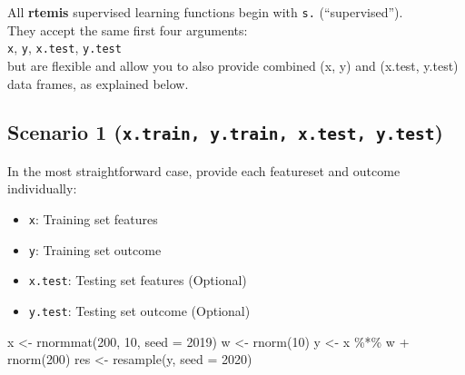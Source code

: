 \documentclass[
]{book}
\newenvironment{Shaded}{\begin{snugshade}}{\end{snugshade}}
\newcommand{\AttributeTok}[1]{\textcolor[rgb]{0.77,0.63,0.00}{#1}}
\newcommand{\DecValTok}[1]{\textcolor[rgb]{0.00,0.00,0.81}{#1}}
\newcommand{\FunctionTok}[1]{\textcolor[rgb]{0.00,0.00,0.00}{#1}}
\newcommand{\NormalTok}[1]{#1}
\newcommand{\OtherTok}[1]{\textcolor[rgb]{0.56,0.35,0.01}{#1}}
\newcommand{\SpecialCharTok}[1]{\textcolor[rgb]{0.00,0.00,0.00}{#1}}
\providecommand{\tightlist}{%
  \setlength{\itemsep}{0pt}\setlength{\parskip}{0pt}}
\begin{document}
All \textbf{rtemis} supervised learning functions begin with \texttt{s.} (``supervised'').\\
They accept the same first four arguments:\\
\texttt{x}, \texttt{y}, \texttt{x.test}, \texttt{y.test}\\
but are flexible and allow you to also provide combined (x, y) and (x.test, y.test) data frames, as explained below.

\hypertarget{scenario-1-x.train-y.train-x.test-y.test}{%
\subsection{\texorpdfstring{Scenario 1 (\texttt{x.train,\ y.train,\ x.test,\ y.test})}{Scenario 1 (x.train, y.train, x.test, y.test)}}\label{scenario-1-x.train-y.train-x.test-y.test}}

In the most straightforward case, provide each featureset and outcome individually:

\begin{itemize}
\tightlist
\item
  \texttt{x}: Training set features
\item
  \texttt{y}: Training set outcome
\item
  \texttt{x.test}: Testing set features (Optional)
\item
  \texttt{y.test}: Testing set outcome (Optional)
\end{itemize}

\begin{Shaded}
\begin{Highlighting}[]
\NormalTok{x }\OtherTok{\textless{}{-}} \FunctionTok{rnormmat}\NormalTok{(}\DecValTok{200}\NormalTok{, }\DecValTok{10}\NormalTok{, }\AttributeTok{seed =} \DecValTok{2019}\NormalTok{)}
\NormalTok{w }\OtherTok{\textless{}{-}} \FunctionTok{rnorm}\NormalTok{(}\DecValTok{10}\NormalTok{)}
\NormalTok{y }\OtherTok{\textless{}{-}}\NormalTok{ x }\SpecialCharTok{\%*\%}\NormalTok{ w }\SpecialCharTok{+} \FunctionTok{rnorm}\NormalTok{(}\DecValTok{200}\NormalTok{)}
\NormalTok{res }\OtherTok{\textless{}{-}} \FunctionTok{resample}\NormalTok{(y, }\AttributeTok{seed =} \DecValTok{2020}\NormalTok{)}
\end{Highlighting}
\end{Shaded}

\begin{Shaded}
\end{Shaded}
\end{document}
